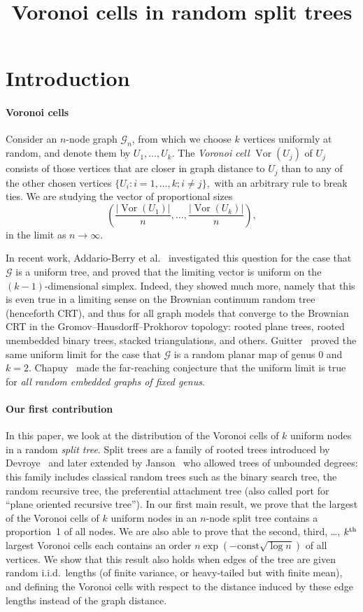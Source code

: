 \documentclass[AHL,Unicode,longabstracts,published]{cedram}
\title{Voronoi cells in random split trees}
\author[\initial{A.} \lastname{Drewitz}]{\firstname{Alexander} \lastname{Drewitz}}
\author[\initial{M.} \lastname{Heydenreich}]{\firstname{Markus} \lastname{Heydenreich}}
\author[\initial{C.} \lastname{Mailler}]{\firstname{Cécile} \lastname{Mailler}}
\newcommand{\Vor}{\operatorname{Vor}}
\newcommand{\clG}{\mathcal{G}}
\newcommand{\const}{\mathrm{const}}
\newcommand{\const}{\mathrm{const}}
\begin{document}
\maketitle

\section{Introduction}\label{sec:intro}
\paragraph*{Voronoi cells}
Consider an $n$-node graph $\clG_n$, from which we choose $k$ vertices uniformly at random, and denote them by $U_1,\dots,U_k$. The \emph{Voronoi cell} $\Vor(U_j)$ of $U_j$ consists of those vertices that are closer in graph distance to $U_j$ than to any of the other chosen vertices $\{U_i\colon i=1,\dots,k; i\neq j\},$ with an arbitrary rule to break ties. We are studying the vector of proportional sizes
\[
\left(\frac{|\Vor(U_1)|}n,\dots,\frac{|\Vor(U_k)|}n\right),
\]
in the limit as $n\to\infty$.

In recent work, Addario-Berry et al.~\cite{Chapuy} investigated this question for the case that $\clG$ is a uniform tree, and proved that the limiting vector is uniform on the $(k-1)$-dimensional simplex. Indeed, they showed much more, namely that this is even true in a limiting sense on the Brownian continuum random tree (henceforth CRT), and thus for all graph models that converge to the Brownian CRT in the Gromov--Hausdorff--Prokhorov topology: rooted plane trees, rooted unembedded binary trees, stacked triangulations, and others. Guitter~\cite{Guitter_2017} proved the same uniform limit for the case that $\clG$ is a random planar map of genus 0 and $k=2$. Chapuy~\cite{Chapu19} made the far-reaching conjecture that the uniform limit is true for \emph{all random embedded graphs of fixed genus}.

\paragraph*{Our first contribution}
In this paper, we look at the distribution of the Voronoi cells of $k$ uniform nodes in a random \emph{split tree}. Split trees are a family of rooted trees introduced by Devroye~\cite{devroye-split} and later extended by Janson~\cite{Janson} who allowed trees of unbounded degrees: this family includes classical random trees such as the binary search tree, the random recursive tree, the preferential attachment tree (also called {\sc port} for ``plane oriented recursive tree''). In our first main result, we prove that the largest of the Voronoi cells of $k$ uniform nodes in an $n$-node split tree contains a proportion~1 of all nodes. We are also able to prove that the second, third, \dots, $k^{\rm th}$ largest Voronoi cells each contains an order $n\exp(-\const\sqrt{\log n})$ of all vertices. We show that this result also holds when edges of the tree are given random i.i.d.\ lengths (of finite variance, or heavy-tailed but with finite mean), and defining the Voronoi cells with respect to the distance induced by these edge lengths instead of the graph distance.
\end{document}
